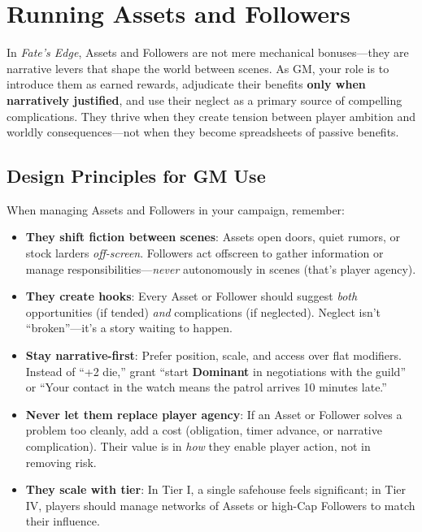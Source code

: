\chapter{Running Assets and Followers}
\label{ch:running-assets-followers}

In \textit{Fate's Edge}, Assets and Followers are not mere mechanical bonuses---they are narrative levers that shape the world between scenes. As GM, your role is to introduce them as earned rewards, adjudicate their benefits \textbf{only when narratively justified}, and use their neglect as a primary source of compelling complications. They thrive when they create tension between player ambition and worldly consequences---not when they become spreadsheets of passive benefits.

\section{Design Principles for GM Use}
When managing Assets and Followers in your campaign, remember:  
\begin{itemize}
  \item \textbf{They shift fiction between scenes}: Assets open doors, quiet rumors, or stock larders \emph{off-screen}. Followers act offscreen to gather information or manage responsibilities---\emph{never} autonomously in scenes (that's player agency).  
  \item \textbf{They create hooks}: Every Asset or Follower should suggest \emph{both} opportunities (if tended) \emph{and} complications (if neglected). Neglect isn't ``broken''---it's a story waiting to happen.  
  \item \textbf{Stay narrative-first}: Prefer position, scale, and access over flat modifiers. Instead of ``+2 die,'' grant ``start \textbf{Dominant} in negotiations with the guild'' or ``Your contact in the watch means the patrol arrives 10 minutes late.''  
  \item \textbf{Never let them replace player agency}: If an Asset or Follower solves a problem too cleanly, add a cost (obligation, timer advance, or narrative complication). Their value is in \textit{how} they enable player action, not in removing risk.  
  \item \textbf{They scale with tier}: In Tier I, a single safehouse feels significant; in Tier IV, players should manage networks of Assets or high-Cap Followers to match their influence.  
\end{itemize}

